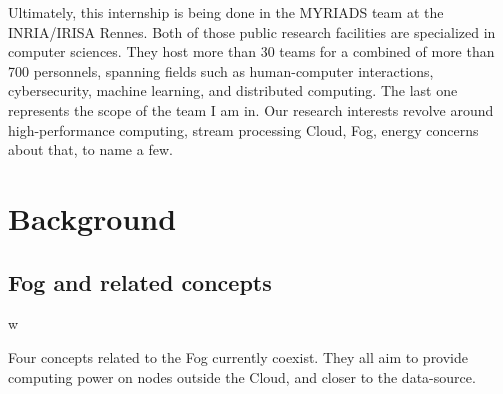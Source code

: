 Ultimately, this internship is being done in the MYRIADS team at the INRIA/IRISA Rennes. Both of those public research facilities are specialized in computer sciences. They host more than 30 teams for a combined of more than 700 personnels, spanning fields such as human-computer interactions, cybersecurity, machine learning, and distributed computing. The last one represents the scope of the team I am in. Our research interests revolve around high-performance computing, stream processing Cloud, Fog, energy concerns about that, to name a few.

\section{Background}
\label{sec:background}

\subsection{Fog and related concepts}w

Four concepts related to the Fog currently coexist. They all aim to provide computing power on nodes outside the Cloud, and closer to the data-source.

